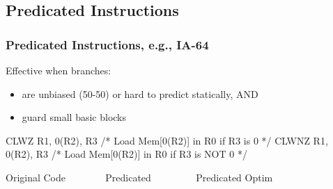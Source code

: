 \documentclass{beamer}
\renewcommand{\emph}[1]{\textcolor{structure}{#1}}
\newcommand{\emp}[1]{\textcolor{DikuRed}{ #1}}
\begin{document}
\subsection{Predicated Instructions}

\begin{frame}[fragile,t]
    \frametitle{Predicated Instructions, e.g., IA-64}

Effective when branches:
\begin{itemize}
    \item are unbiased (50-50) or hard to predict statically, AND
    \item guard small basic blocks
\end  {itemize}

\begin{colorcode}[fontsize=\scriptsize]
    CLWZ  R1, 0(R2), R3   /* Load Mem[0(R2)] in R0 if R3 is     0 */
    CLWNZ R1, 0(R2), R3   /* Load Mem[0(R2)] in R0 if R3 is NOT 0 */
\end{colorcode}


\begin{block}{Original Code{\tt~~~~~~~~}Predicated{\tt~~~~~~~~~}Predicated Optim}\vspace{-1ex}
\begin{columns}
\end{columns}
\end{block}

\bigskip


\end{frame}
\end{document}
